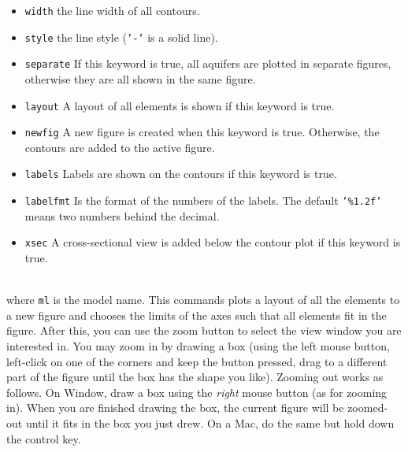 \documentclass [10pt,letterpaper] {article}
\begin{document}
\begin{itemize}
\item{\tt width} the line width of all contours.
\item{\tt style} the line style ({\tt '-'} is a solid line).
\item{\tt separate} If this keyword is true, all aquifers are plotted in separate figures, otherwise they are all shown in the same figure.
\item{\tt layout} A layout of all elements is shown if this keyword is true.
\item{\tt newfig} A new figure is created when this keyword is true. Otherwise, the contours are added to the active figure.
\item{\tt labels} Labels are shown on the contours if this keyword is true.
\item{\tt labelfmt} Is the format of the numbers of the labels. The default {\tt '\%1.2f'} means two numbers behind the decimal.
\item{\tt xsec} A cross-sectional view is added below the contour plot if this keyword is true.
\end{itemize}

\vskip0.5cm
\\where {\tt ml} is the model name. This commands plots a layout of all the elements to a new figure and chooses the limits of the axes such that all elements fit in the figure. After this, you can use the zoom button to select the view window you are interested in. You may zoom in by drawing a box (using the left mouse button, left-click on one of the corners and keep the button pressed, drag to a different part of the figure until the box has the shape you like).  Zooming out works as follows. On Window, draw a box using the \emph{right} mouse button (as for zooming in). When you are finished drawing the box, the current figure will be zoomed-out until it fits in the box you just drew. On a Mac, do the same but hold down the control key.
\end{document}
